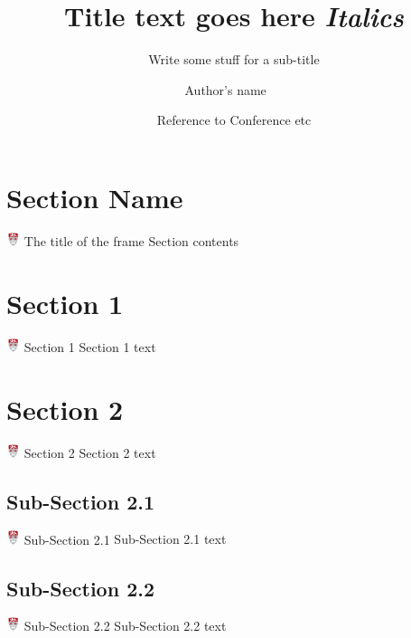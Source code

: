 \documentclass{beamer}
\title[Title: Title Used for Footer] %
{Title text goes here {\em Italics} }
\subtitle{Write some stuff for a sub-title}
\author[Author's Name] %
{Author's name~\inst{1} ~\inst{2}}
\institute[Institution] %
{
  \inst{1}%
	First Association
  \and
  \inst{2}%
    Second association
}
\date[Date] %
{Reference to Conference etc}
\begin{document}
	\begin{frame}
		\titlepage
	\end{frame}

\section{Section Name}
	\begin{frame}{
		\includegraphics[height=0.4cm,width=0.4cm,keepaspectratio]{CrestTrans.png}
		The title of the frame
	}
		Section contents
	\end{frame}

\section{Section 1}
	\begin{frame}{\includegraphics[height=0.4cm,width=0.4cm,keepaspectratio]{CrestTrans.png}
		Section 1}
		Section 1 text
	\end{frame}

\section{Section 2}
	\begin{frame}{\includegraphics[height=0.4cm,width=0.4cm,keepaspectratio]{CrestTrans.png}
		Section 2}
		Section 2 text
	\end{frame}
\subsection{Sub-Section 2.1}
	\begin{frame}{\includegraphics[height=0.4cm,width=0.4cm,keepaspectratio]{CrestTrans.png}
		Sub-Section 2.1}
		Sub-Section 2.1 text
	\end{frame}
\subsection{Sub-Section 2.2}
	\begin{frame}{\includegraphics[height=0.4cm,width=0.4cm,keepaspectratio]{CrestTrans.png}
		Sub-Section 2.2}
		Sub-Section 2.2 text
	\end{frame}
\end{document}
